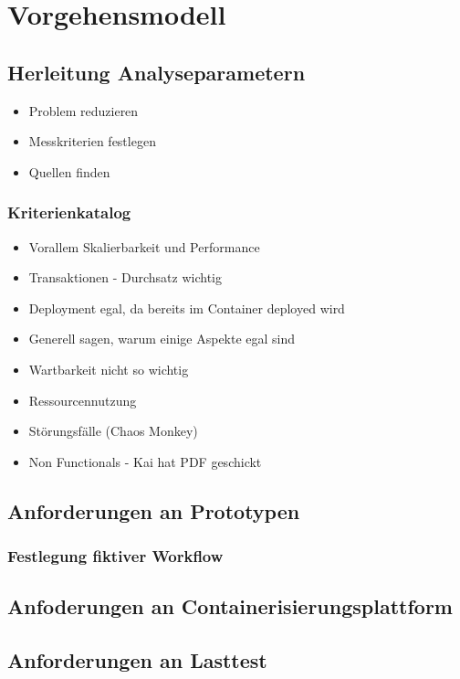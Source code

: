 \chapter{Vorgehensmodell}

\section{Herleitung Analyseparametern}
\begin{itemize}
  \item Problem reduzieren
  \item Messkriterien festlegen
  \item Quellen finden
\end{itemize}



\subsection{Kriterienkatalog}
\begin{itemize}
  \item Vorallem Skalierbarkeit und Performance
  \item Transaktionen - Durchsatz wichtig
  \item Deployment egal, da bereits im Container deployed wird
  \item Generell sagen, warum einige Aspekte egal sind
  \item Wartbarkeit nicht so wichtig
  \item Ressourcennutzung
  \item St\"orungsf\"alle (Chaos Monkey)
  \item Non Functionals - Kai hat PDF geschickt
\end{itemize}

\section{Anforderungen an Prototypen}

\subsection{Festlegung fiktiver Workflow}

\section{Anfoderungen an Containerisierungsplattform}
\section{Anforderungen an Lasttest}

